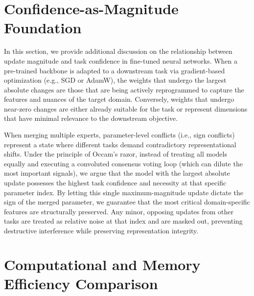 \documentclass{article}
\theoremstyle{plain}
\theoremstyle{definition}
\theoremstyle{remark}
\begin{document}










\newpage
\appendix
\onecolumn
\section{Confidence-as-Magnitude Foundation}
\label{app:magnitude_confidence}

In this section, we provide additional discussion on the relationship between update magnitude and task confidence in fine-tuned neural networks.
When a pre-trained backbone is adapted to a downstream task via gradient-based optimization (e.g., SGD or AdamW), the weights that undergo the largest absolute changes are those that are being actively reprogrammed to capture the features and nuances of the target domain.
Conversely, weights that undergo near-zero changes are either already suitable for the task or represent dimensions that have minimal relevance to the downstream objective.

When merging multiple experts, parameter-level conflicts (i.e., sign conflicts) represent a state where different tasks demand contradictory representational shifts.
Under the principle of Occam's razor, instead of treating all models equally and executing a convoluted consensus voting loop (which can dilute the most important signals), we argue that the model with the largest absolute update possesses the highest task confidence and necessity at that specific parameter index.
By letting this single maximum-magnitude update dictate the sign of the merged parameter, we guarantee that the most critical domain-specific features are structurally preserved.
Any minor, opposing updates from other tasks are treated as relative noise at that index and are masked out, preventing destructive interference while preserving representation integrity.

\section{Computational and Memory Efficiency Comparison}
\label{app:complexity_analysis}
\end{document}
